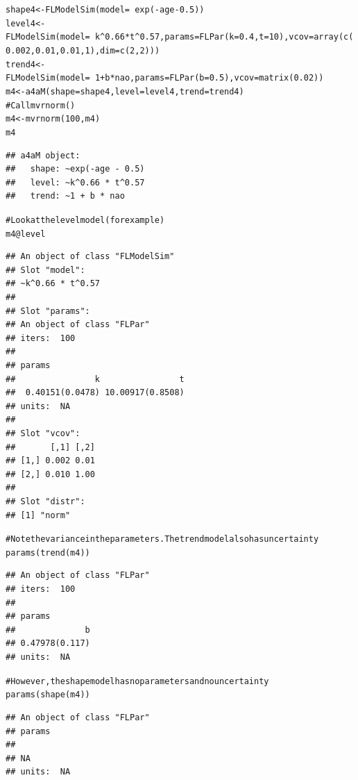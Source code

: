 \documentclass[a4paper,english,10pt]{article}\usepackage[]{graphicx}\usepackage[]{color}
\makeatletter
\newcommand{\hlnum}[1]{\textcolor[rgb]{0.2,0.2,0.2}{#1}}%
\newcommand{\hlcom}[1]{\textcolor[rgb]{0.2,0.267,0.4}{#1}}%
\newcommand{\hlopt}[1]{\textcolor[rgb]{0.2,0.2,0.2}{#1}}%
\newcommand{\hlstd}[1]{\textcolor[rgb]{0,0,0}{#1}}%
\newcommand{\hlkwb}[1]{\textcolor[rgb]{0.361,0.506,0.596}{#1}}%
\newcommand{\hlkwc}[1]{\textcolor[rgb]{0.361,0.506,0.596}{#1}}%
\newcommand{\hlkwd}[1]{\textcolor[rgb]{0.361,0.506,0.596}{#1}}%
\newenvironment{kframe}{%
 \def\at@end@of@kframe{}%
 \ifinner\ifhmode%
  \def\at@end@of@kframe{\end{minipage}}%
  \begin{minipage}{\columnwidth}%
 \fi\fi%
 \def\FrameCommand##1{\hskip\@totalleftmargin \hskip-\fboxsep
 \colorbox{shadecolor}{##1}\hskip-\fboxsep
     \hskip-\linewidth \hskip-\@totalleftmargin \hskip\columnwidth}%
 \MakeFramed {\advance\hsize-\width
   \@totalleftmargin\z@ \linewidth\hsize
   \@setminipage}}%
 {\par\unskip\endMakeFramed%
 \at@end@of@kframe}
\newenvironment{knitrout}{}{} %
\makeatother
\begin{document}
\begin{knitrout}
\color{fgcolor}\begin{kframe}
\begin{alltt}
\hlstd{shape4} \hlkwb{<-} \hlkwd{FLModelSim}\hlstd{(}\hlkwc{model}\hlstd{=}\hlopt{~}\hlkwd{exp}\hlstd{(}\hlopt{-}\hlstd{age}\hlopt{-}\hlnum{0.5}\hlstd{))}
\hlstd{level4} \hlkwb{<-} \hlkwd{FLModelSim}\hlstd{(}\hlkwc{model}\hlstd{=}\hlopt{~}\hlstd{k}\hlopt{^}\hlnum{0.66}\hlopt{*}\hlstd{t}\hlopt{^}\hlnum{0.57}\hlstd{,} \hlkwc{params}\hlstd{=}\hlkwd{FLPar}\hlstd{(}\hlkwc{k}\hlstd{=}\hlnum{0.4}\hlstd{,} \hlkwc{t}\hlstd{=}\hlnum{10}\hlstd{),} \hlkwc{vcov}\hlstd{=}\hlkwd{array}\hlstd{(}\hlkwd{c}\hlstd{(}\hlnum{0.002}\hlstd{,} \hlnum{0.01}\hlstd{,}\hlnum{0.01}\hlstd{,} \hlnum{1}\hlstd{),} \hlkwc{dim}\hlstd{=}\hlkwd{c}\hlstd{(}\hlnum{2}\hlstd{,}\hlnum{2}\hlstd{)))}
\hlstd{trend4} \hlkwb{<-} \hlkwd{FLModelSim}\hlstd{(}\hlkwc{model}\hlstd{=}\hlopt{~}\hlnum{1}\hlopt{+}\hlstd{b}\hlopt{*}\hlstd{nao,} \hlkwc{params}\hlstd{=}\hlkwd{FLPar}\hlstd{(}\hlkwc{b}\hlstd{=}\hlnum{0.5}\hlstd{),} \hlkwc{vcov}\hlstd{=}\hlkwd{matrix}\hlstd{(}\hlnum{0.02}\hlstd{))}
\hlstd{m4} \hlkwb{<-} \hlkwd{a4aM}\hlstd{(}\hlkwc{shape}\hlstd{=shape4,} \hlkwc{level}\hlstd{=level4,} \hlkwc{trend}\hlstd{=trend4)}
\hlcom{# Call mvrnorm()}
\hlstd{m4} \hlkwb{<-} \hlkwd{mvrnorm}\hlstd{(}\hlnum{100}\hlstd{, m4)}
\hlstd{m4}
\end{alltt}
\begin{verbatim}
## a4aM object:
##   shape: ~exp(-age - 0.5)
##   level: ~k^0.66 * t^0.57
##   trend: ~1 + b * nao
\end{verbatim}
\begin{alltt}
\hlcom{# Look at the level model (for example)}
\hlstd{m4}\hlopt{@}\hlkwc{level}
\end{alltt}
\begin{verbatim}
## An object of class "FLModelSim"
## Slot "model":
## ~k^0.66 * t^0.57
## 
## Slot "params":
## An object of class "FLPar"
## iters:  100 
## 
## params
##                k                t 
##  0.40151(0.0478) 10.00917(0.8508) 
## units:  NA 
## 
## Slot "vcov":
##       [,1] [,2]
## [1,] 0.002 0.01
## [2,] 0.010 1.00
## 
## Slot "distr":
## [1] "norm"
\end{verbatim}
\begin{alltt}
\hlcom{# Note the variance in the parameters. The trend model also has uncertainty}
\hlkwd{params}\hlstd{(}\hlkwd{trend}\hlstd{(m4))}
\end{alltt}
\begin{verbatim}
## An object of class "FLPar"
## iters:  100 
## 
## params
##              b 
## 0.47978(0.117) 
## units:  NA
\end{verbatim}
\begin{alltt}
\hlcom{# However, the shape model has no parameters and no uncertainty}
\hlkwd{params}\hlstd{(}\hlkwd{shape}\hlstd{(m4))}
\end{alltt}
\begin{verbatim}
## An object of class "FLPar"
## params
##    
## NA 
## units:  NA
\end{verbatim}
\end{kframe}
\end{knitrout}
\end{document}
